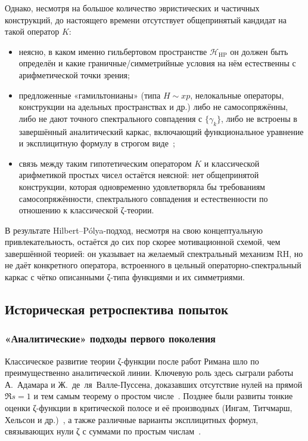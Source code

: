\documentclass{article}
\numberwithin{equation}{section}
\theoremstyle{plain}
\theoremstyle{definition}
\theoremstyle{remark}
\begin{document}
Однако, несмотря на большое количество эвристических и частичных конструкций, до настоящего времени отсутствует общепринятый кандидат на такой оператор $K$:
\begin{itemize}
  \item неясно, в каком именно гильбертовом пространстве $\mathcal H_{\mathrm{HP}}$ он должен быть определён и какие граничные/симметрийные условия на нём естественны с арифметической точки зрения;
  \item предложенные «гамильтонианы» (типа $H\sim xp$, нелокальные операторы, конструкции на адельных пространствах и др.) либо не самосопряжённы, либо не дают точного спектрального совпадения с $\{\gamma_k\}$, либо не встроены в завершённый аналитический каркас, включающий функциональное уравнение и эксплицитную формулу в строгом виде~\cite{BerryKeating1999,Connes1999,Hejhal1990};
  \item связь между таким гипотетическим оператором $K$ и классической арифметикой простых чисел остаётся неясной: нет общепринятой конструкции, которая одновременно удовлетворяла бы требованиям самосопряжённости, спектрального совпадения и естественности по отношению к классической ζ-теории.
\end{itemize}

\noindent
В результате Hilbert--Pólya-подход, несмотря на свою концептуальную привлекательность, остаётся до сих пор скорее мотивационной схемой, чем завершённой теорией: он указывает на желаемый спектральный механизм RH, но не даёт конкретного оператора, встроенного в цельный операторно-спектральный каркас с чётко описанными ζ-типа функциями и их симметриями.



\subsection{Историческая ретроспектива попыток}
\label{subsec:historical-overview}

\subsubsection{«Аналитические» подходы первого поколения}
\label{subsubsec:analytic-first-gen}

\noindent
Классическое развитие теории ζ-функции после работ Римана шло по преимущественно аналитической линии. 
Ключевую роль здесь сыграли работы А.~Адамара и Ж.~де~ля~Валле-Пуссена, доказавших отсутствие нулей на прямой $\Re s=1$ и тем самым теорему о простом числе~\cite{Hadamard1896,ValleePoussin1896}. 
Позднее были развиты тонкие оценки ζ-функции в критической полосе и её производных (Ингам, Титчмарш, Хельсон и др.)~\cite{Ingham1932,Titchmarsh1986}, а также различные варианты эксплицитных формул, связывающих нули ζ с суммами по простым числам~\cite{Delsarte1942,Montgomery1971,IK2004}.
\end{document}
